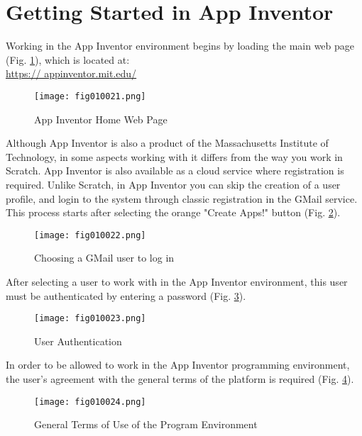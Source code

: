 \section{Getting Started in App Inventor}

Working in the App Inventor environment begins by loading the main web page (Fig. \ref{fig010021}), which is located at: \\ \href{https://appinventor.mit.edu/}{https:// appinventor.mit.edu/}

\begin{figure}[H]
   \centering
   \texttt{[image: fig010021.png]}
   \caption{App Inventor Home Web Page}
\label{fig010021}
\end{figure}

Although App Inventor is also a product of the Massachusetts Institute of Technology, in some aspects working with it differs from the way you work in Scratch. App Inventor is also available as a cloud service where registration is required. Unlike Scratch, in App Inventor you can skip the creation of a user profile, and login to the system through classic registration in the GMail service. This process starts after selecting the orange "Create Apps!" button (Fig. \ref{fig010022}).

\begin{figure}[H]
   \centering
   \texttt{[image: fig010022.png]}
   \caption{Choosing a GMail user to log in}
\label{fig010022}
\end{figure}

After selecting a user to work with in the App Inventor environment, this user must be authenticated by entering a password (Fig. \ref{fig010023}).

\begin{figure}[H]
   \centering
   \texttt{[image: fig010023.png]}
   \caption{User Authentication}
\label{fig010023}
\end{figure}

In order to be allowed to work in the App Inventor programming environment, the user's agreement with the general terms of the platform is required (Fig. \ref{fig010024}).

\begin{figure}[H]
   \centering
   \texttt{[image: fig010024.png]}
   \caption{General Terms of Use of the Program Environment}
\label{fig010024}
\end{figure}

